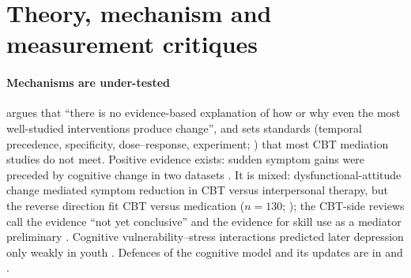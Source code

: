 \section{Theory, mechanism and measurement critiques}\label{sec:mechanism}
\paragraph{Mechanisms are under-tested} \citet{kazdin2009understanding} argues that ``there is no evidence-based explanation of how or why even the most well-studied interventions produce change'', and sets standards (temporal precedence, specificity, dose--response, experiment; \citealp{kraemer2002mediators}) that most CBT mediation studies do not meet.
Positive evidence exists: sudden symptom gains were preceded by cognitive change in two datasets \citep{tang1999sudden,tang2005cognitive}.
It is mixed: dysfunctional-attitude change mediated symptom reduction in CBT versus interpersonal therapy, but the reverse direction fit CBT versus medication ($n=130$; \citealp{quilty2008mediational}); the CBT-side reviews call the evidence ``not yet conclusive'' \citep{driessen2010mediators} and the evidence for skill use as a mediator preliminary \citep{hundt2013skills}.
Cognitive vulnerability--stress interactions predicted later depression only weakly in youth \citep{lakdawalla2007cognitive}.
Defences of the cognitive model and its updates are in \citet{beck2014generic} and \citet{hofmann2013science}.

